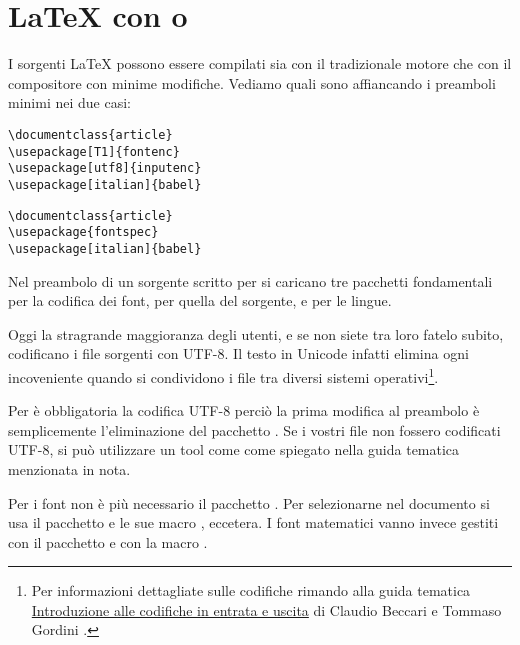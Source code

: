 \section{\LaTeX{} con  o }

I sorgenti \LaTeX{} possono essere compilati sia con il tradizionale motore
 che con il compositore  con minime modifiche.
Vediamo quali sono affiancando i preamboli minimi nei due casi:\\
\begin{tcolorbox}[width=(\linewidth/2-1mm),equal height group=A,nobeforeafter]
\begin{Verbatim}[numbers=none, xleftmargin=0pt]
% !TeX program = pdfLaTeX
\documentclass{article}
\usepackage[T1]{fontenc}
\usepackage[utf8]{inputenc}
\usepackage[italian]{babel}
\end{Verbatim}
\end{tcolorbox}
%
\begin{tcolorbox}[width=(\linewidth/2-1mm),equal height group=A,nobeforeafter]
\begin{Verbatim}[numbers=none, xleftmargin=0pt]
% !TeX program = LuaLaTeX
\documentclass{article}
\usepackage{fontspec}
\usepackage[italian]{babel}
\end{Verbatim}
\end{tcolorbox}

Nel preambolo di un sorgente scritto per  si caricano tre
pacchetti fondamentali  per la codifica dei font, 
per quella del sorgente, e  per le lingue.

Oggi la stragrande maggioranza degli utenti, e se non siete tra loro fatelo
subito, codificano i file sorgenti con UTF-8. Il testo in Unicode infatti
elimina ogni incoveniente quando si condividono i file tra diversi sistemi
operativi\footnote{Per informazioni dettagliate sulle codifiche rimando alla
guida tematica \GuIT{}
\href{http://www.guitex.org/home/images/doc/GuideGuIT/introcodifiche.pdf}{%
Introduzione alle codifiche in entrata e uscita} di Claudio Beccari e Tommaso
Gordini \cite{gt:codifiche}.}.

Per \LuaTeX{} è obbligatoria la codifica UTF-8 perciò la prima modifica al
preambolo è semplicemente l'eliminazione del pacchetto . Se i
vostri file non fossero codificati UTF-8, si può utilizzare un tool come
 come spiegato nella guida tematica menzionata in nota.

Per i font non è più necessario il pacchetto . Per selezionarne
nel documento si usa il pacchetto  e le sue macro
,  eccetera. I font matematici vanno invece
gestiti con il pacchetto  e con la macro .

